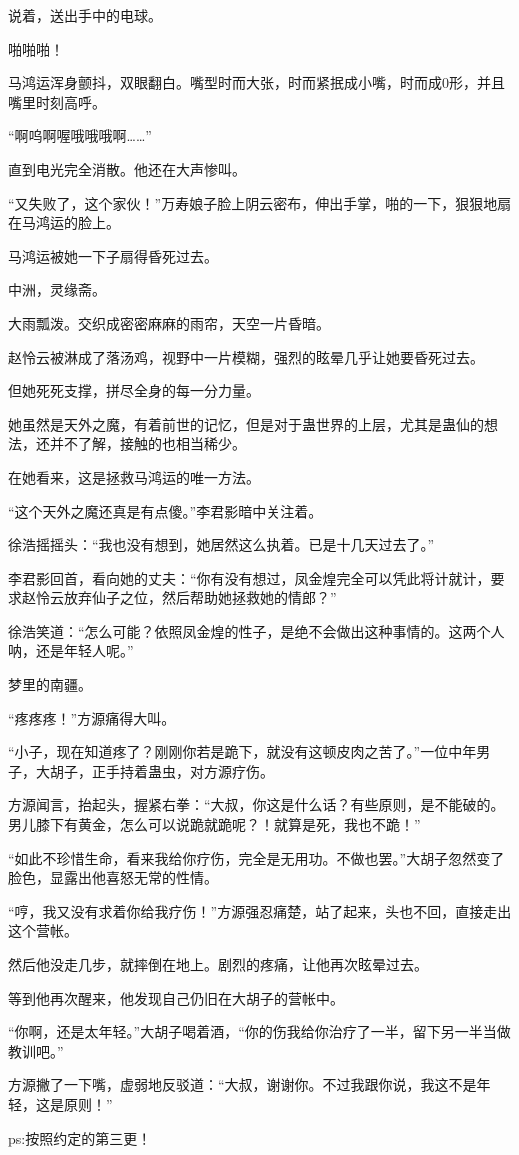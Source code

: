 \begin{this_body}
说着，送出手中的电球。

啪啪啪！

马鸿运浑身颤抖，双眼翻白。嘴型时而大张，时而紧抿成小嘴，时而成0形，并且嘴里时刻高呼。

“啊呜啊喔哦哦哦啊……”

直到电光完全消散。他还在大声惨叫。

“又失败了，这个家伙！”万寿娘子脸上阴云密布，伸出手掌，啪的一下，狠狠地扇在马鸿运的脸上。

马鸿运被她一下子扇得昏死过去。

中洲，灵缘斋。

大雨瓢泼。交织成密密麻麻的雨帘，天空一片昏暗。

赵怜云被淋成了落汤鸡，视野中一片模糊，强烈的眩晕几乎让她要昏死过去。

但她死死支撑，拼尽全身的每一分力量。

她虽然是天外之魔，有着前世的记忆，但是对于蛊世界的上层，尤其是蛊仙的想法，还并不了解，接触的也相当稀少。

在她看来，这是拯救马鸿运的唯一方法。

“这个天外之魔还真是有点傻。”李君影暗中关注着。

徐浩摇摇头：“我也没有想到，她居然这么执着。已是十几天过去了。”

李君影回首，看向她的丈夫：“你有没有想过，凤金煌完全可以凭此将计就计，要求赵怜云放弃仙子之位，然后帮助她拯救她的情郎？”

徐浩笑道：“怎么可能？依照凤金煌的性子，是绝不会做出这种事情的。这两个人呐，还是年轻人呢。”

梦里的南疆。

“疼疼疼！”方源痛得大叫。

“小子，现在知道疼了？刚刚你若是跪下，就没有这顿皮肉之苦了。”一位中年男子，大胡子，正手持着蛊虫，对方源疗伤。

方源闻言，抬起头，握紧右拳：“大叔，你这是什么话？有些原则，是不能破的。男儿膝下有黄金，怎么可以说跪就跪呢？！就算是死，我也不跪！”

“如此不珍惜生命，看来我给你疗伤，完全是无用功。不做也罢。”大胡子忽然变了脸色，显露出他喜怒无常的性情。

“哼，我又没有求着你给我疗伤！”方源强忍痛楚，站了起来，头也不回，直接走出这个营帐。

然后他没走几步，就摔倒在地上。剧烈的疼痛，让他再次眩晕过去。

等到他再次醒来，他发现自己仍旧在大胡子的营帐中。

“你啊，还是太年轻。”大胡子喝着酒，“你的伤我给你治疗了一半，留下另一半当做教训吧。”

方源撇了一下嘴，虚弱地反驳道：“大叔，谢谢你。不过我跟你说，我这不是年轻，这是原则！”

ps:按照约定的第三更！

\end{this_body}

